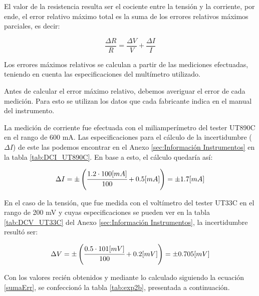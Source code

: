El valor de la resistencia resulta ser el cociente entre la tensión y la corriente, por ende, el error relativo máximo total es la suma de los errores relativos máximos parciales, es decir:

\begin{equation}
    \frac{\Delta R}{R} = \frac{\Delta V}{V} + \frac{\Delta I}{I}
    \label{sumaErr}
\end{equation}

Los errores máximos relativos se calculan a partir de las mediciones efectuadas, teniendo en cuenta las especificaciones del multímetro utilizado. 

Antes de calcular el error máximo relativo, debemos averiguar el error de cada medición. Para esto se utilizan los datos que cada fabricante indica en el manual del instrumento. 

La medición de corriente fue efectuada con el miliamperímetro del tester UT890C en el rango de 600 mA. Las especificaciones para el cálculo de la incertidumbre ($\Delta I$) de este las podemos encontrar en el Anexo \ref{sec:Información Instrumentos} en la tabla \ref{tab:DCI_UT890C}. En base a esto, el cálculo quedaría así:

\begin{equation}
    \Delta I = \pm \left( \cfrac{1.2 \cdot 100 [mA]}{100} + 0.5 [mA] \right) = \pm 1.7 [mA]  
\end{equation}

En el caso de la tensión, que fue medida con el voltímetro del tester UT33C en el rango de 200 mV y cuyas especificaciones se pueden ver en la tabla \ref{tab:DCV_UT33C} del Anexo \ref{sec:Información Instrumentos}, la incertidumbre resultó ser:

\begin{equation}
    \Delta V = \pm \left( \cfrac{0.5 \cdot 101 [mV]}{100} + 0.2 [mV] \right) = \pm 0.705 [mV]  
\end{equation}

Con los valores recién obtenidos y mediante lo calculado siguiendo la ecuación \ref{sumaErr}, se confeccionó la tabla \ref{tab:exp2b}, presentada a continuación.

\begin{table}[h!]
    \centering
        \def\tablename{Tabla} 
        \caption{Incertidumbre y error relativo de las mediciones sobre la probeta}
        \label{tab:exp2b}
\end{table}

